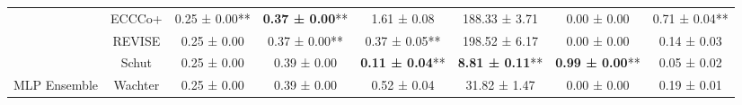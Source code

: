 \begin{table}
{\begin{tabular}[t]{cccccccc}
 & ECCCo+ & 0.25 ± 0.00** & \textbf{0.37 ± 0.00}** & 1.61 ± 0.08\hphantom{*}\hphantom{*} & 188.33 ± 3.71\hphantom{*}\hphantom{*} & 0.00 ± 0.00\hphantom{*}\hphantom{*} & 0.71 ± 0.04**\\

 & REVISE & 0.25 ± 0.00\hphantom{*}\hphantom{*} & 0.37 ± 0.00** & 0.37 ± 0.05** & 198.52 ± 6.17\hphantom{*}\hphantom{*} & 0.00 ± 0.00\hphantom{*}\hphantom{*} & 0.14 ± 0.03\hphantom{*}\hphantom{*}\\

 & Schut & 0.25 ± 0.00\hphantom{*}\hphantom{*} & 0.39 ± 0.00\hphantom{*}\hphantom{*} & \textbf{0.11 ± 0.04}** & \textbf{8.81 ± 0.11}** & \textbf{0.99 ± 0.00}** & 0.05 ± 0.02\hphantom{*}\hphantom{*}\\

\multirow[t]{-6}{*}{\centering\arraybackslash MLP Ensemble} & Wachter & 0.25 ± 0.00\hphantom{*}\hphantom{*} & 0.39 ± 0.00\hphantom{*}\hphantom{*} & 0.52 ± 0.04\hphantom{*}\hphantom{*} & 31.82 ± 1.47\hphantom{*}\hphantom{*} & 0.00 ± 0.00\hphantom{*}\hphantom{*} & 0.19 ± 0.01\hphantom{*}\hphantom{*}\\
\bottomrule
\end{tabular}}
\end{table}
